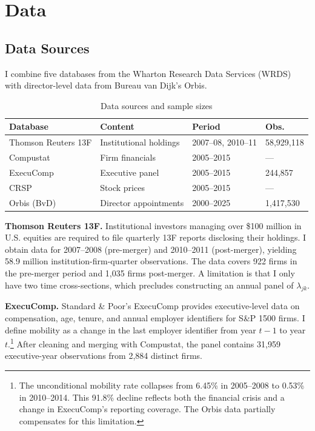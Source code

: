 \documentclass[11pt,a4paper]{article}
\begin{document}
\section{Data}
\label{sec:data}

\subsection{Data Sources}

I combine five databases from the Wharton Research Data Services (WRDS) with director-level data from Bureau van Dijk's Orbis.

\begin{table}[h!]
\centering
\begin{tabular}{p{3.2cm}p{2.8cm}p{3cm}p{2.5cm}}
\toprule
\textbf{Database} & \textbf{Content} & \textbf{Period} & \textbf{Obs.} \\
\midrule
Thomson Reuters 13F & Institutional holdings & 2007--08, 2010--11 & 58,929,118 \\
Compustat & Firm financials & 2005--2015 & --- \\
ExecuComp & Executive panel & 2005--2015 & 244,857 \\
CRSP & Stock prices & 2005--2015 & --- \\
Orbis (BvD) & Director appointments & 2000--2025 & 1,417,530 \\
\bottomrule
\end{tabular}
\caption{Data sources and sample sizes}
\label{tab:data}
\end{table}

\textbf{Thomson Reuters 13F.} Institutional investors managing over \$100 million in U.S. equities are required to file quarterly 13F reports disclosing their holdings. I obtain data for 2007--2008 (pre-merger) and 2010--2011 (post-merger), yielding 58.9 million institution-firm-quarter observations. The data covers 922 firms in the pre-merger period and 1,035 firms post-merger. A limitation is that I only have two time cross-sections, which precludes constructing an annual panel of $\lambda_{jk}$.

\textbf{ExecuComp.} Standard \& Poor's ExecuComp provides executive-level data on compensation, age, tenure, and annual employer identifiers for S\&P 1500 firms. I define mobility as a change in the last employer identifier from year $t-1$ to year $t$.\footnote{The unconditional mobility rate collapses from 6.45\% in 2005--2008 to 0.53\% in 2010--2014. This 91.8\% decline reflects both the financial crisis and a change in ExecuComp's reporting coverage. The Orbis data partially compensates for this limitation.} After cleaning and merging with Compustat, the panel contains 31,959 executive-year observations from 2,884 distinct firms.
\end{document}
